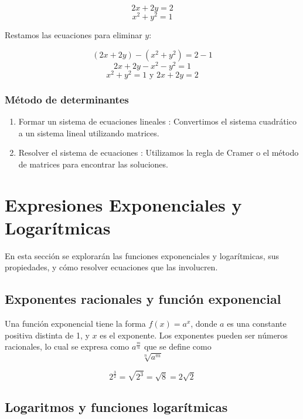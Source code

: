        \[
       2x + 2y = 2
       \]
       \[
       x^2 + y^2 = 1
       \]
    
       Restamos las ecuaciones para eliminar \(y\):
    
       \[
       (2x + 2y) - (x^2 + y^2) = 2 - 1
       \]
       \[
       2x + 2y - x^2 - y^2 = 1
       \]
       \[
       x^2 + y^2 = 1 \text{ y } 2x + 2y = 2
       \]
    
    \subsubsection{Método de determinantes}
    
    \begin{enumerate}
        \item Formar un sistema de ecuaciones lineales : Convertimos el sistema cuadrático a un sistema lineal utilizando matrices.
        \item Resolver el sistema de ecuaciones : Utilizamos la regla de Cramer o el método de matrices para encontrar las soluciones.    
    \end{enumerate}
    




    \section{Expresiones Exponenciales y Logarítmicas} %

    En esta sección se explorarán las funciones exponenciales y logarítmicas, sus propiedades, y cómo resolver ecuaciones que las involucren.
    
    \subsection{Exponentes racionales y función exponencial}
    
    Una función exponencial tiene la forma \( f(x) = a^x \), donde \( a \) es una constante positiva distinta de 1, y \( x \) es el exponente. Los exponentes pueden ser números racionales, lo cual se expresa como \( a^{\frac{m}{n}} \) que se define como
    \begin{equation}
        \sqrt[n]{a^m}
    \end{equation}
    \begin{example}
        \[2^{\frac{3}{2}} = \sqrt{2^3} = \sqrt{8} = 2\sqrt{2}\]
    \end{example}
    \subsection{Logaritmos y funciones logarítmicas}
    
